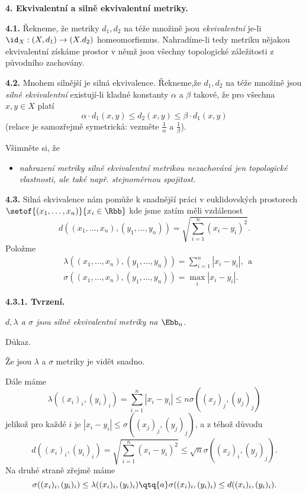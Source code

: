 \documentclass[12pt]{article}
\begin{document}
{  \vskip10mm
 
 {\large\bf 4. Ekvivalentní a silně ekvivalentní metriky.}
  
 \bigskip
 
 
 {\bf 4.1.} Řekneme, že metriky $d_1,d_2$ na téže množině jsou  {\em ekvivalentní} je-li $\id_X:(X,d_1)\to(X.d_2)$ homeomorfismus. Nahradíme-li tedy metriku nějakou ekvivalentní získáme prostor v němž jsou všechny topologické záležitosti z původního zachovány.
 
 \bigskip
 
 {\bf 4.2.} Mnohem silnější je silná ekvivalence. Řekneme,že $d_1,d_2$ na  téže množině jsou {\em silně ekvivalentní} existují-li kladné konstanty $\alpha$ a $\beta$ takové, že pro všechna  $x,y\in X$ platí
 $$
 \alpha\cdot d_1(x,y)\leq d_2(x,y)\leq\beta \cdot d_1(x,y)
 $$
 (relace je samozřejmě symetrická: vezměte $\frac1{\alpha}$ a $\frac1{\beta}$).
 
 Všimněte si, že 
 \begin{itemize}
 \item[] {\em nahrazení metriky silně ekvivalentní metrikou nezachovává jen topologické vlastnosti, ale také např. stejnoměrnou spojitost.}
 \end{itemize}
 
 \bigskip
 
 {\bf 4.3.} Silná ekvivalence nám pomůže k snadnější práci v euklidovských prostorech
 $
 \setof{(x_1,\dots,x_n)}{x_i\in\Rbb}
 $
 kde jsme zatím měli vzdálenost
 $$
 d((x_1,\dots,x_n),(y_1,\dots,y_n))=\sqrt{\sum_{i=1}^n(x_i-y_i)^2}. 
 $$
Položme
 $$ 
 \begin{aligned}
 &\lambda((x_1,\dots,x_n),(y_1,\dots,y_n))=\sum_{i=1}^n|x_i-y_i|, \ \ \text{a}\\
 &\sigma((x_1,\dots,x_n),(y_1,\dots,y_n))=\max_i|x_i-y_i|.
 \end{aligned}
 $$
 
 \medskip
 
 {\bf 4.3.1. Tvrzení.} {\em $d,\lambda$ a $\sigma$ jsou silně ekvivalentní metriky na $\Ebb_n$.
 
 Důkaz.} Že jsou $\lambda$ a $\sigma$ metriky je vidět snadno.

 Dále máme
 $$
 \lambda((x_i)_i,(y_i)_i)=\sum_{i=1}^n|x_i-y_i|\leq n\sigma((x_j)_j,(y_j)_j)
 $$
 jelikož pro každé $i$ je $|x_i-y_i|\leq \sigma((x_j)_j,(y_j)_j)$, a z téhož důvodu
 $$
 d((x_i)_i,(y_i)_i)=\sqrt{\sum_{i=1}^n(x_i-y_i)^2}\leq \sqrt n\sigma((x_j)_i,(y_j)_j).
 $$
 Na druhé straně zřejmě máme
 $$
 \sigma((x_i)_i,(y_i)_i)\leq \lambda((x_i)_i,(y_i)_i)\qtq{a}\sigma((x_i)_i,(y_i)_i)\leq d((x_i)_i,(y_i)_i).
 $$ \sq
 
}
\end{document}
